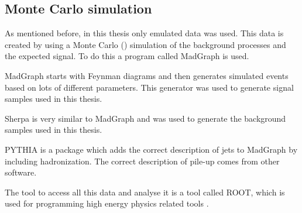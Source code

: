 \subsection{Monte Carlo simulation}
As mentioned before, in this thesis only emulated data was used. This data is created by using a Monte Carlo (\abbrMC) simulation of the background processes and the expected signal. To do this a program called MadGraph is used.

MadGraph \citep{madgraph} starts with Feynman diagrams and then generates simulated events based on lots of different parameters. This generator was used to generate signal samples used in this thesis. 

Sherpa \citep{sherpa} is very similar to MadGraph and was used to generate the background samples used in this thesis.

PYTHIA \citep{Sjostrand:2008} is a package which adds the correct description of jets to MadGraph by including hadronization. The correct description of pile-up comes from other \abbrATLAS software.

The tool to access all this data and analyse it is a tool called ROOT, which is used for programming high energy physics related tools \citep{root}.